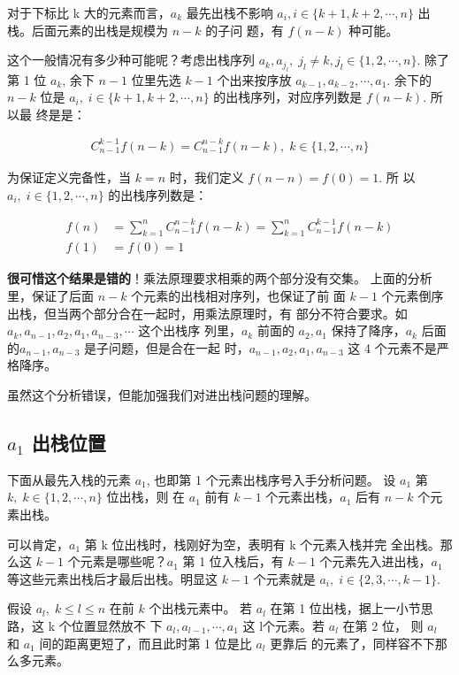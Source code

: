 对于下标比 k 大的元素而言，$a_k$ 最先出栈不影响 $a_i, i \in
\{k+1,k+2,\cdots,n\}$ 出栈。后面元素的出栈是规模为 $n - k$ 的子问
题，有 $f(n - k)$ 种可能。

这个一般情况有多少种可能呢？考虑出栈序列
$a_k, a_{j_l},\; j_l \neq k, j_l \in \{1,2,\cdots,n\}$. 除了第 1
位 $a_k$, 余下 $n - 1$ 位里先选 $k - 1$ 个出来按序放 $a_{k-1},
a_{k-2}, \cdots, a_1$. 余下的 $n - k$ 位是 $a_i,\; i \in
\{k+1,k+2,\cdots,n\}$ 的出栈序列，对应序列数是 $f(n - k)$. 所以最
终是是：

\begin{align*}
C_{n-1}^{k-1}f(n-k) = C_{n-1}^{n-k}f(n-k),\; k \in \{1,2,\cdots,n\}
\end{align*}

为保证定义完备性，当 $k = n$ 时，我们定义 $f(n-n) = f(0) = 1$. 所
以 $a_i,\; i \in \{1,2,\cdots,n\}$ 的出栈序列数是：

\begin{align*}
  f(n) &= \sum_{k = 1}^nC_{n-1}^{n-k}f(n-k) = \sum_{k=1}^n C_{n-1}^{k-1}f(n-k) \\
  f(1) &= f(0) = 1
\end{align*}

\textbf{很可惜这个结果是错的}！乘法原理要求相乘的两个部分没有交集。
上面的分析里，保证了后面 $n - k$ 个元素的出栈相对序列，也保证了前
面 $k - 1$ 个元素倒序出栈，但当两个部分合在一起时，用乘法原理时，有
部分不符合要求。如 $a_k,a_{n-1},a_2,a_1,a_{n-3},\cdots$ 这个出栈序
列里，$a_k$ 前面的 $a_2,a_1$ 保持了降序，$a_k$ 后面
的$a_{n-1},a_{n-3}$ 是子问题，但是合在一起
时，$a_{n-1},a_2,a_1,a_{n-3}$ 这 4 个元素不是严格降序。

虽然这个分析错误，但能加强我们对进出栈问题的理解。

\subsection{$a_1$ 出栈位置}

下面从最先入栈的元素 $a_1$, 也即第 1 个元素出栈序号入手分析问题。
设 $a_1$ 第 $k,\; k \in \{1,2,\cdots,n\}$ 位出栈，则
在 $a_1$ 前有 $k - 1$ 个元素出栈，$a_1$ 后有 $n - k$ 个元素出栈。

可以肯定，$a_1$ 第 k 位出栈时，栈刚好为空，表明有 k 个元素入栈并完
全出栈。那么这 $k - 1$ 个元素是哪些呢？$a_1$ 第 1 位入栈后，有 $k
- 1$ 个元素先入进出栈，$a_1$ 等这些元素出栈后才最后出栈。明显这 $k
- 1$ 个元素就是 $a_i,\; i \in \{2,3,\cdots,k-1\}$.

假设 $a_l,\; k \leq l \leq n$ 在前 $k$ 个出栈元素中。
若 $a_l$ 在第 1 位出栈，据上一小节思路，这 k 个位置显然放不
下 $a_l, a_{l-1},\cdots,a_1$ 这 l个元素。若 $a_l$ 在第 2 位，
则 $a_l$ 和 $a_1$ 间的距离更短了，而且此时第 1 位是比 $a_l$ 更靠后
的元素了，同样容不下那么多元素。

